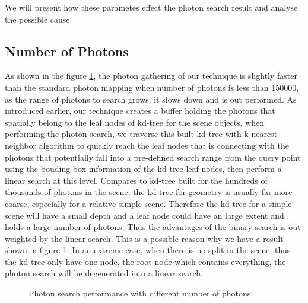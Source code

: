 We will present how these parametes effect the photon search result and analyse the possible cause. 

\subsection{Number of Photons} 

As shown in the figure \ref{fig:photon_search_1}, the photon gathering of our technique is slightly faster than the standard photon mapping when number of photons is less than 150000, as the range of photons to search grows, it slows down and is out performed. As introduced earlier, our technique creates a buffer holding the photons that spatially belong to the leaf nodes of kd-tree for the scene objects, when performing the photon search, we traverse this built kd-tree with k-nearest neighbor algorithm to quickly reach the leaf nodes that is connecting with the photons that potentially fall into a pre-defined search range from the query point using the bouding box information of the kd-tree leaf nodes, then perform a linear search at this level. Compares to kd-tree built for the hundreds of thousands of photons in the scene, the kd-tree for geometry is usually far more coarse, especially for a relative simple scene. Therefore the kd-tree for a simple scene will have a small depth and a leaf node could have an large extent and holds a large number of photons. Thus the advantages of the binary search is out-weighted by the linear search. This is a possible reason why we have a result shown in figure \ref{fig:photon_search_1}. In an extreme case, when there is no split in the scene, thus the kd-tree only have one node, the root node which contains everything, the photon search will be degenerated into a linear search. 

\begin{figure}[ftp] 
    \centering 
    \renewcommand{\thefigure}{\thechapter.\arabic{figure}}
    \caption[]{Photon search performance with different number of photons. }
    \label{fig:photon_search_1}  
\end{figure} 

